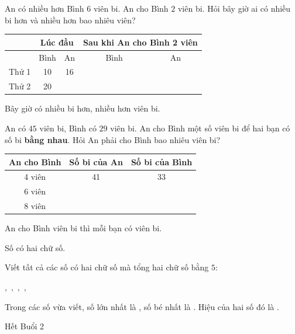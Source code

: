 \documentclass[../main.tex]{subfiles}
\begin{document}
\begin{bt}
    An có nhiều hơn Bình $6$ viên bi. An cho Bình $2$ viên bi. Hỏi bây giờ ai có nhiều bi hơn và nhiều hơn bao nhiêu viên?
    \TTbatdauhinh
    {\centering
    \renewcommand{\arraystretch}{1.3}
    \begin{tabular}{|c|c|c|c|c|}
        \hline
        & \multicolumn{2}{c|}{\textbf{Lúc đầu}} & \multicolumn{2}{c|}{\textbf{Sau khi An cho Bình 2 viên}} \\
        \hline
        & Bình & An & Bình & An \\
        \hline
        Thử 1 & 10 & 16 & & \\
        \hline
        Thử 2 & 20 & & & \\
        \hline
    \end{tabular}\par}
    \par\medskip\noindent Bây giờ \TTcham[1.5cm] có nhiều bi hơn, nhiều hơn \TTcham[1.2cm] viên bi.
\end{bt}

\begin{bt}
    An có $45$ viên bi, Bình có $29$ viên bi. An cho Bình một số viên bi để hai bạn có số bi \textbf{bằng nhau}. Hỏi An phải cho Bình bao nhiêu viên bi?
    \TTbatdauhinh
    {\centering
    \renewcommand{\arraystretch}{1.3}
    \begin{tabular}{|c|c|c|}
        \hline
        \textbf{An cho Bình} & \textbf{Số bi của An} & \textbf{Số bi của Bình} \\
        \hline
        4 viên & 41 & 33 \\
        \hline
        6 viên & & \\
        \hline
        8 viên & & \\
        \hline
    \end{tabular}\par}
    \par\medskip\noindent An cho Bình \TTcham[1.2cm] viên bi thì mỗi bạn có \TTcham[1.2cm] viên bi.
\end{bt}

\begin{bt}
    Số có hai chữ số.
    \par\nopagebreak
    \begin{listEX}
        \item Viết tất cả các số có hai chữ số mà tổng hai chữ số bằng $5$:\par\vspace{4pt}
        \TTcham[1cm],\ \TTcham[1cm],\ \TTcham[1cm],\ \TTcham[1cm],\ \TTcham[1cm]
        \item Trong các số vừa viết, số lớn nhất là \TTcham[1.2cm], số bé nhất là \TTcham[1.2cm]. Hiệu của hai số đó là \TTcham[1.2cm].
    \end{listEX}
\end{bt}

\begin{center}
       \faGg\faGg\quad Hết Buổi 2 \quad\faGg\faGg
\end{center}
\end{document}
